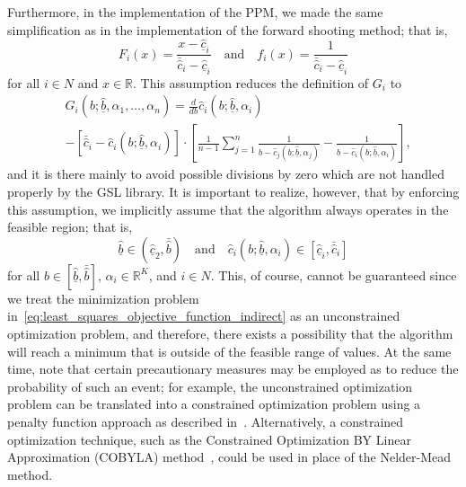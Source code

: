 Furthermore, in the implementation of the PPM, we made the same simplification as in the implementation of the forward shooting method; that is,
\begin{equation*}
  F_i(x) = \frac{x - \underline{\hat{c}}_i}{\bar{\hat{c}}_i - \underline{\hat{c}}_i} \quad\text{and}\quad f_i(x) = \frac{1}{\bar{\hat{c}}_i - \underline{\hat{c}}_i}
\end{equation*}
for all $i\in N$ and $x\in\mathbb{R}$. This assumption reduces the definition of $G_i$ to
\begin{align*}
  &G_i(b; \underline{\hat{b}}, \alpha_1, \dotsc, \alpha_n) = \displaystyle\frac{d}{db}\hat{c}_i(b;\underline{\hat{b}}, \alpha_i)\\
  &- \displaystyle\left[ \bar{\hat{c}}_i - \hat{c}_i(b;\underline{\hat{b}}, \alpha_i)\right]\cdot\left[ \frac{1}{n-1}\sum_{j=1}^n\frac{1}{b - \hat{c}_j(b;\underline{\hat{b}}, \alpha_j)} - \frac{1}{b - \hat{c}_i(b;\underline{\hat{b}}, \alpha_i)} \right],
\end{align*}
and it is there mainly to avoid possible divisions by zero which are not handled properly by the GSL library. It is important to realize, however, that by enforcing this assumption, we implicitly assume that the algorithm always operates in the feasible region; that is,
\begin{equation*}
  \underline{\hat{b}}\in (\underline{\hat{c}}_2, \bar{\hat{b}}) \quad\text{and}\quad \hat{c}_i(b;\underline{\hat{b}}, \alpha_i)\in [\underline{\hat{c}}_i, \bar{\hat{c}}_i]
\end{equation*}
for all $b\in [\underline{\hat{b}}, \bar{\hat{b}}]$, $\alpha_i\in\mathbb{R}^K$, and $i\in N$. This, of course, cannot be guaranteed since we treat the minimization problem in~\eqref{eq:least_squares_objective_function_indirect} as an unconstrained optimization problem, and therefore, there exists a possibility that the algorithm will reach a minimum that is outside of the feasible range of values. At the same time, note that certain precautionary measures may be employed as to reduce the probability of such an event; for example, the unconstrained optimization problem can be translated into a constrained optimization problem using a penalty function approach as described in~\cite{AvrielPenalty2003}. Alternatively, a constrained optimization technique, such as the Constrained Optimization BY Linear Approximation (COBYLA) method~\cite{Powell1994}, could be used in place of the Nelder-Mead method.

